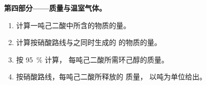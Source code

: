 \begin{problem}
\medskip
\noindent\textbf{第四部分——质量与温室气体。}
\begin{enumerate}[resume]
  \item 计算一吨己二酸中所含的物质的量。
  \item 计算按硝酸路线与之同时生成的  的物质的量。
  \item 按 \qty{95}{\percent} 计算，
        每吨己二酸所需环己醇的质量。
  \item 按硝酸路线，每吨己二酸所释放的  质量，
        以吨为单位给出。
\end{enumerate}
\end{problem}
